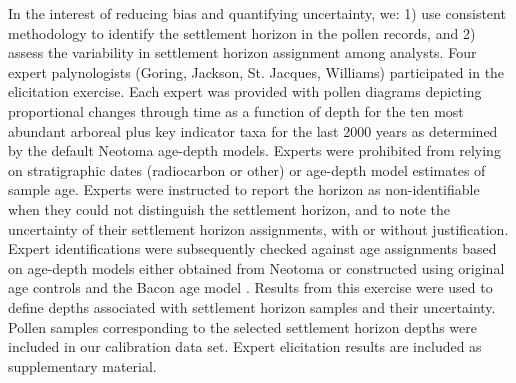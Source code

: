 \documentclass[12pt]{article}
\begin{document}
In the interest of reducing bias and quantifying uncertainty, we: 1)
use consistent methodology to identify the settlement horizon in the
pollen records, and 2) assess the variability in settlement horizon
assignment among analysts. Four expert palynologists (Goring, Jackson,
St. Jacques, Williams) participated in the elicitation exercise. Each
expert was provided with pollen diagrams depicting proportional
changes through time as a function of depth for the ten most abundant
arboreal plus key indicator taxa for the last 2000 years as determined
by the default Neotoma age-depth models. Experts were prohibited from
relying on stratigraphic dates (radiocarbon or other) or age-depth
model estimates of sample age. Experts were instructed to report the
horizon as non-identifiable when they could not distinguish the
settlement horizon, and to note the uncertainty of their settlement
horizon assignments, with or without justification. Expert
identifications were subsequently checked against age assignments
based on age-depth models either obtained from Neotoma or constructed
using original age controls and the Bacon age model
\citep{blaauw2011flexible}.  Results from this exercise were used to
define depths associated with settlement horizon samples and their
uncertainty. Pollen samples corresponding to the selected settlement
horizon depths were included in our calibration data set. Expert
elicitation results are included as supplementary material.
\end{document}
